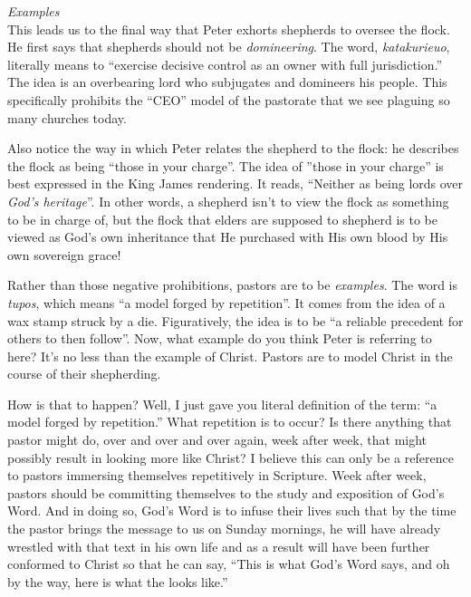 \documentclass[letterpaper, 12pt]{article}
\begin{document}
    \noindent \emph{Examples} \\

    This leads us to the final way that Peter exhorts shepherds to
    oversee the flock. He first says that shepherds should not be
    \emph{domineering}.  The word, \emph{katakurieuo}, literally means
    to ``exercise decisive control as an owner with full jurisdiction.''
    The idea is an overbearing lord who subjugates and domineers his
    people.  This specifically prohibits the ``CEO'' model of the
    pastorate that we see plaguing so many churches today.

    Also notice the way in which Peter relates the shepherd to the
    flock: he describes the flock as being ``those in your charge''.
    The idea of ''those in your charge'' is best expressed in the King
    James rendering.  It reads, ``Neither as being lords over
    \emph{God's heritage}''.  In other words, a shepherd isn't to view
    the flock as something to be in charge of, but the flock that elders
    are supposed to shepherd is to be viewed as God's own inheritance
    that He purchased with His own blood by His own sovereign grace!

    Rather than those negative prohibitions, pastors are to be
    \emph{examples}. The word is \emph{tupos}, which means ``a model
    forged by repetition''.  It comes from the idea of a wax stamp
    struck by a die.  Figuratively, the idea is to be ``a reliable
    precedent for others to then follow''. Now, what example do you
    think Peter is referring to here?  It's no less than the example of
    Christ. Pastors are to model Christ in the course of their
    shepherding. 

    How is that to happen? Well, I just gave you literal definition of
    the term: ``a model forged by repetition.'' What repetition is to
    occur? Is there anything that pastor might do, over and over and
    over again, week after week, that might possibly result in looking
    more like Christ? I believe this can only be a reference to pastors
    immersing themselves repetitively in Scripture. Week after week,
    pastors should be committing themselves to the study and exposition
    of God's Word. And in doing so, God's Word is to infuse their lives
    such that by the time the pastor brings the message to us on Sunday
    mornings, he will have already wrestled with that text in his own
    life and as a result will have been further conformed to Christ so
    that he can say, ``This is what God's Word says, and oh by the way,
    here is what the looks like.''
\end{document}
